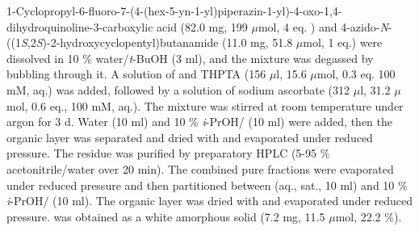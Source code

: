 1-Cyclopropyl-6-fluoro-7-(4-(hex-5-yn-1-yl)piperazin-1-yl)-4-oxo-1,4\hyp{}dihydro\-quinoline-3-carboxylic acid  (82.0 mg, 199 $\mu$mol, 4 eq.%
) and 4\hyp{}azido\hyp{}\textit{N}\hyp{}((1\textit{S},2\textit{S})\hyp{}2\hyp{}hydroxycyclopentyl)butanamide  (11.0 mg, 51.8 $\mu$mol, 1 eq.) were dissolved in 10 \% water/\textit{t}-BuOH (3 ml), and the mixture was degassed by bubbling  through it. 
A solution of  and THPTA (156 $\mu$l, 15.6 $\mu$mol, 0.3 eq. 100 mM, aq.) was added, followed by a solution of sodium ascorbate (312 $\mu$l, 31.2 $\mu$mol, 0.6 eq., 100 mM, aq.). 
The mixture was stirred at room temperature under argon for 3 d. Water (10 ml) and 10 \% \textit{i}-PrOH/ (10 ml) were added, then the organic layer was separated and dried with  and evaporated under reduced pressure. 
The residue was purified by preparatory HPLC (5-95 \% acetonitrile/water over 20 min). The combined pure fractions were evaporated under reduced pressure and then partitioned between  (aq., sat., 10 ml) and 10 \% \textit{i}-PrOH/ (10 ml). The organic layer was dried with  and evaporated under reduced pressure.
 was obtained as a white amorphous solid (7.2 mg, 11.5 $\mu$mol, 22.2 \%).
\\[1\baselineskip]
\\[1\baselineskip]
